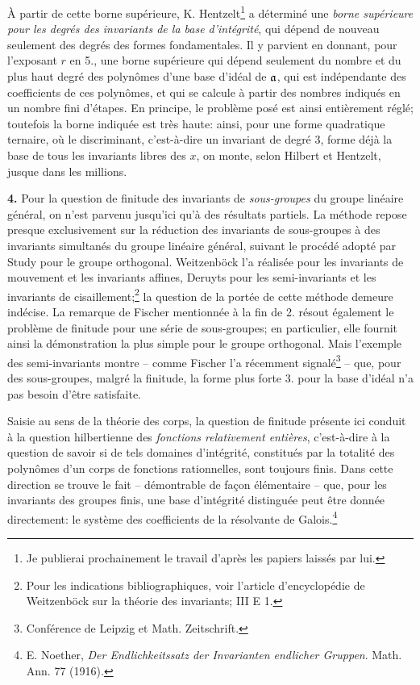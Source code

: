 À partir de cette borne supérieure, K. Hentzelt\footnote{Je publierai prochainement le travail d'après les papiers laissés par lui.} a déterminé une \emph{borne supérieure pour les degrés des invariants de la base d'intégrité}, qui dépend de nouveau seulement des degrés des formes fondamentales. Il y parvient en donnant, pour l'exposant $r$ en 5., une borne supérieure qui dépend seulement du nombre et du plus haut degré des polynômes d'une base d'idéal de $\mathfrak{a}$, qui est indépendante des coefficients de ces polynômes, et qui se calcule à partir des nombres indiqués en un nombre fini d'étapes. En principe, le problème posé est ainsi entièrement réglé; toutefois la borne indiquée est très haute: ainsi, pour une forme quadratique ternaire, où le discriminant, c'est-à-dire un invariant de degré 3, forme déjà la base de tous les invariants libres des $x$, on monte, selon Hilbert et Hentzelt, jusque dans les millions.

\textbf{4.} Pour la question de finitude des invariants de \emph{sous-groupes} du groupe linéaire général, on n'est parvenu jusqu'ici qu'à des résultats partiels. La méthode repose presque exclusivement sur la réduction des invariants de sous-groupes à des invariants simultanés du groupe linéaire général, suivant le procédé adopté par Study pour le groupe orthogonal. Weitzenböck l'a réalisée pour les invariants de mouvement et les invariants affines, Deruyts pour les semi-invariants et les invariants de cisaillement;\footnote{Pour les indications bibliographiques, voir l'article d'encyclopédie de Weitzenböck sur la théorie des invariants; III E 1.} la question de la portée de cette méthode demeure indécise. La remarque de Fischer mentionnée à la fin de 2. résout également le problème de finitude pour une série de sous-groupes; en particulier, elle fournit ainsi la démonstration la plus simple pour le groupe orthogonal. Mais l'exemple des semi-invariants montre -- comme Fischer l'a récemment signalé\footnote{Conférence de Leipzig et Math. Zeitschrift.} -- que, pour des sous-groupes, malgré la finitude, la forme plus forte 3. pour la base d'idéal n'a pas besoin d'être satisfaite.

Saisie au sens de la théorie des corps, la question de finitude présente ici conduit à la question hilbertienne des \emph{fonctions relativement entières}, c'est-à-dire à la question de savoir si de tels domaines d’intégrité, constitués par la totalité des polynômes d'un corps de fonctions rationnelles, sont toujours finis. Dans cette direction se trouve le fait -- démontrable de façon élémentaire -- que, pour les invariants des groupes finis, une base d'intégrité distinguée peut être donnée directement: le système des coefficients de la résolvante de Galois.\footnote{E. Noether, \emph{Der Endlichkeitssatz der Invarianten endlicher Gruppen}. Math. Ann. 77 (1916).}


